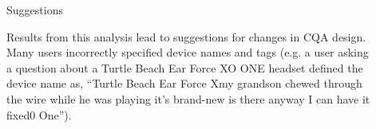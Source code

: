 \documentclass[final]{beamer}
\newlength{\sepwid}
\newlength{\onecolwid}
\newlength{\twocolwid}
\begin{document}
\begin{frame}[t]
\begin{columns}[t]
\begin{column}{\twocolwid}
\begin{columns}[t,totalwidth=\twocolwid]
\begin{column}{\onecolwid}
\begin{block}{Suggestions}

Results from this analysis lead to suggestions for changes in CQA design. Many users incorrectly specified device names and tags (e.g. a user asking a question about a Turtle Beach Ear Force XO ONE headset defined the device name as, ``Turtle Beach Ear Force Xmy grandson chewed through the wire while he was playing it's brand-new is there anyway I can have it fixed0 One'').

\end{block}


\end{column} %

\end{columns} %

\begin{columns}[t,totalwidth=\twocolwid] %

\begin{column}{\onecolwid} %

\end{column} %

\begin{column}{\onecolwid} %

\end{column} %

\end{columns} %

\end{column} %

\begin{column}{\sepwid}\end{column} %

\begin{column}{\onecolwid} %



\end{column}
\end{columns}
\end{frame}
\end{document}
